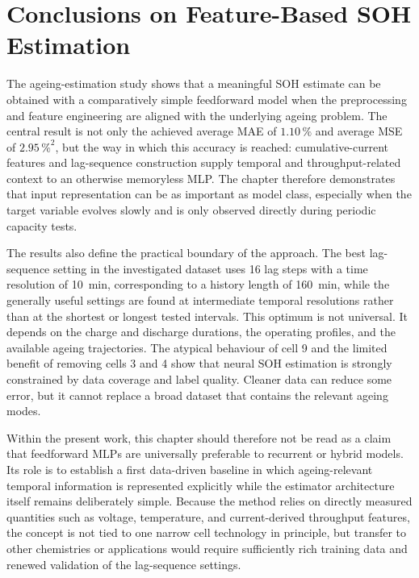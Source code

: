 \documentclass[
    a4paper,
    12pt,
    titlepage,
    bibliography=totoc,
    twoside=on,
    parskip=false,
    numbers=noenddot,
    cleardoublepage=empty,
    DIV=12,
    BCOR=12.0mm,
    headheight=36pt,
    headings=openright
]{scrreprt}
\begin{document}
\section{Conclusions on Feature-Based SOH Estimation}
The ageing-estimation study shows that a meaningful SOH estimate can be obtained with a comparatively simple feedforward model when the preprocessing and feature engineering are aligned with the underlying ageing problem. The central result is not only the achieved average MAE of $1.10\,\%$ and average MSE of $2.95\,\%^{2}$, but the way in which this accuracy is reached: cumulative-current features and lag-sequence construction supply temporal and throughput-related context to an otherwise memoryless MLP. The chapter therefore demonstrates that input representation can be as important as model class, especially when the target variable evolves slowly and is only observed directly during periodic capacity tests.

The results also define the practical boundary of the approach. The best lag-sequence setting in the investigated dataset uses 16 lag steps with a time resolution of \SI{10}{\minute}, corresponding to a history length of \SI{160}{\minute}, while the generally useful settings are found at intermediate temporal resolutions rather than at the shortest or longest tested intervals. This optimum is not universal. It depends on the charge and discharge durations, the operating profiles, and the available ageing trajectories. The atypical behaviour of cell 9 and the limited benefit of removing cells 3 and 4 show that neural SOH estimation is strongly constrained by data coverage and label quality. Cleaner data can reduce some error, but it cannot replace a broad dataset that contains the relevant ageing modes.

Within the present work, this chapter should therefore not be read as a claim that feedforward MLPs are universally preferable to recurrent or hybrid models. Its role is to establish a first data-driven baseline in which ageing-relevant temporal information is represented explicitly while the estimator architecture itself remains deliberately simple. Because the method relies on directly measured quantities such as voltage, temperature, and current-derived throughput features, the concept is not tied to one narrow cell technology in principle, but transfer to other chemistries or applications would require sufficiently rich training data and renewed validation of the lag-sequence settings.
\end{document}
